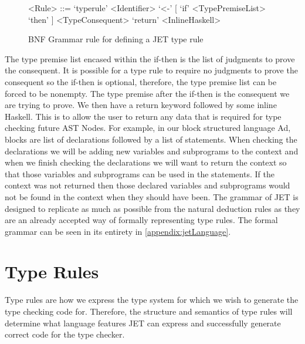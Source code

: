 \begin{figure}[]
    \begin{grammar}
        <Rule> ::= `typerule' <Identifier> `<-' [ `if' <TypePremiseList> `then' ] <TypeConsequent> `return' <InlineHaskell>
    \end{grammar}
    \caption{BNF Grammar rule for defining a JET type rule}
    \label{}
\end{figure}


The type premise list encased within the if-then is the list of judgments to prove the consequent.
It is possible for a type rule to require no judgments to prove the consequent so the if-then is optional, therefore, the type premise list can be forced to be nonempty.
The type premise after the if-then is the consequent we are trying to prove.
We then have a return keyword followed by some inline Haskell.
This is to allow the user to return any data that is required for type checking future AST Nodes.
For example, in our block structured language Ad, blocks are list of declarations followed by a list of statements.
When checking the declarations we will be adding new variables and subprograms to the context and when we finish checking the declarations we will want to return the context so that those variables and subprograms can be used in the statements.
If the context was not returned then those declared variables and subprograms would not be found in the context when they should have been.
The grammar of JET is designed to replicate as much as possible from the natural deduction rules as they are an already accepted way of formally representing type rules.
The formal grammar can be seen in its entirety in \autoref{appendix:jetLanguage}.

\section{Type Rules}
Type rules are how we express the type system for which we wish to generate the type checking code for.
Therefore, the structure and semantics of type rules will determine what language features JET can express and successfully generate correct code for the type checker.

